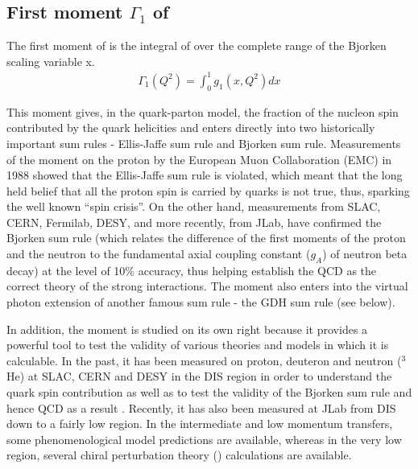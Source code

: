 

\subsection{First moment $\Gamma_1$ of \gone }
The first moment of \gones is the integral of \gones over the complete range of the Bjorken scaling variable x.
\begin{eqnarray}
\label{eqGamma1}
\Gamma_1(Q^2)  = \int^{1}_0  g_1(x,Q^2) dx
\end{eqnarray}

This moment gives, in the quark-parton model, the fraction of the nucleon spin contributed by the quark helicities and enters directly into two historically important sum rules - Ellis-Jaffe sum rule and Bjorken sum rule. Measurements of the moment on the proton by the European Muon Collaboration (EMC) in 1988 showed that the Ellis-Jaffe sum rule is violated, which meant that the long held belief that all the proton spin is carried by quarks is not %
true, thus, sparking the well known ``spin crisis''. On the other hand, measurements from SLAC, CERN, Fermilab, DESY, and more recently, from JLab, have confirmed the Bjorken sum rule (which relates the difference of the first moments of the proton and the neutron to the fundamental axial coupling constant ($g_A$) of neutron beta decay) at the level of 10\% accuracy, thus helping establish the QCD as the correct theory of the strong interactions. The moment also enters into the virtual photon extension of another famous sum rule -  the GDH sum rule (see below).

In addition, the moment is studied on its own right because it provides a powerful tool to test the validity of various theories and models in which it is calculable. In the past, it has been measured on proton, deuteron and neutron ($^3$He) at SLAC, CERN and DESY in the DIS region in order to understand the quark spin contribution as well as to test the validity of the Bjorken sum rule and hence %
QCD as a result \cite{pLeaderKuhnChen}. Recently, it has also been measured at JLab from DIS down to a fairly low \qsqs region. In the intermediate and low momentum transfers, some phenomenological model predictions are available, whereas in the very low \qsqs region, several %
chiral perturbation theory (\chipt) calculations are available. %

